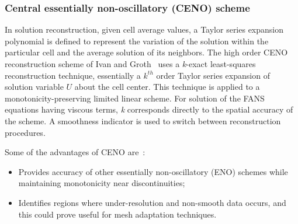 \subsubsection{Central essentially non-oscillatory (CENO) scheme}
\label{section:CENO}
In solution reconstruction, given cell average values, a Taylor series expansion polynomial is defined to represent the variation of the solution within the particular cell and the average solution of its neighbors. 
The high order CENO reconstruction scheme of Ivan and Groth~\cite{ivan:2007, ivan:2013b} uses a \textit{k}-exact least-squares reconstruction technique, essentially a $k^{th}$ order Taylor series expansion of solution variable $U$ about the cell center. This technique is applied to a monotonicity-preserving limited linear scheme. For solution of the FANS equations having viscous terms, \textit{k}
corresponds directly to the spatial accuracy of the scheme. A smoothness indicator is used to switch between reconstruction procedures.\par
Some of the advantages of CENO are~\cite{Groth:2013}:
\begin{itemize}
\setlength\itemsep{0.1em}
\item Provides accuracy of other essentially non-oscillatory (ENO) schemes while maintaining monotonicity near discontinuities;
\item Identifies regions where under-resolution and non-smooth data occurs, and this could prove useful for mesh adaptation techniques.
\end{itemize}

